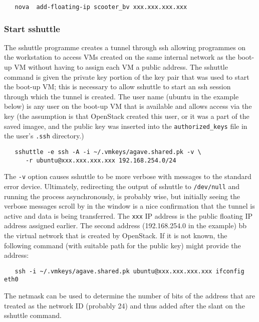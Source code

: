 \small\begin{verbatim}
   nova  add-floating-ip scooter_bv xxx.xxx.xxx.xxx
\end{verbatim}\normalsize

\subsubsection{Start sshuttle}
The sshuttle programme creates a tunnel through ssh allowing programmes on the workstation to access VMs created on the 
same internal network as the boot-up VM without having to assign each VM a public address. 
The sshuttle command is given the private key portion of the key pair that was used to start the boot-up VM; this is 
necessary to allow sshuttle to start an ssh session through which the tunnel is created.
The user name (ubuntu in the example below) is any user on the boot-up VM that is available and allows access via
the key (the assumption is that OpenStack created this user, or it was a part of the saved imagee,  and the public key was 
inserted into the \verb!authorized_keys! file in the user's \verb!.ssh! directory.)

\small\begin{verbatim}
   sshuttle -e ssh -A -i ~/.vmkeys/agave.shared.pk -v \
      -r ubuntu@xxx.xxx.xxx.xxx 192.168.254.0/24 
\end{verbatim}\normalsize

\noindent
The \verb!-v! option causes sshuttle to be more verbose with messages to the standard error device.
Ultimately, redirecting the output of sshuttle to \verb!/dev/null! and running the process asynchronously, is probably 
wise, but initially seeing the verbose messages scroll by in the window is a nice confirmation that the tunnel is active and data 
is being transferred. 
The \verb!xxx! IP address is the public floating IP address assigned earlier.  The second address (192.168.254.0 in the example)
bb the virtual network that is created by OpenStack.  
If it is not known, the following command (with suitable path for the public key) might provide the address:

\small\begin{verbatim}
   ssh -i ~/.vmkeys/agave.shared.pk ubuntu@xxx.xxx.xxx.xxx ifconfig eth0
\end{verbatim}\normalsize

The netmask can be used to determine the number of bits of the address that are treated as the network ID (probably 24) and thus
added after the slant on the sshuttle command.

\vspace{20 pt}
